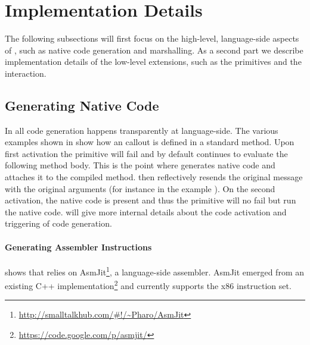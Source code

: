 \section{\NBFFI Implementation Details}

The following subsections will first focus on the high-level, language-side aspects of \NB, such as native code generation and marshalling.
As a second part we describe implementation details of the low-level extensions, such as the \NB primitives and the \JIT interaction.

\subsection{Generating Native Code}

In \NB all code generation happens transparently at language-side.
The various examples shown in  show how an \FFI callout is defined in a standard method.
Upon first activation the \NB primitive will fail and by default continues to evaluate the following method body.
This is the point where \NB generates native code and attaches it to the compiled method.
\NB then reflectively resends the original message with the original arguments (for instance  in the example ).
On the second activation, the native code is present and thus the primitive will no fail but run the native code.
 will give more internal details about the code activation and triggering of code generation.

\paragraph{Generating Assembler Instructions}

 shows that \NB relies on AsmJit\footnote{\url{http://smalltalkhub.com/\#!/~Pharo/AsmJit}}, a language-side assembler.
AsmJit emerged from an existing C++ implementation\footnote{\url{https://code.google.com/p/asmjit/}} and currently supports the x86 instruction set.


